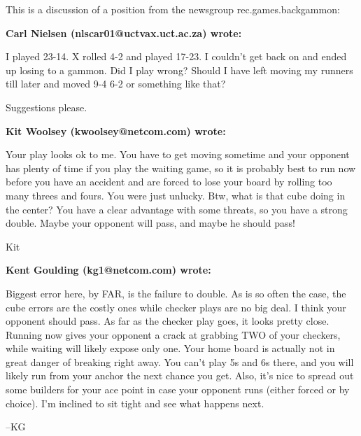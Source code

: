


\setlength{\parindent}{0pt}
\setlength{\parskip}{1em}

This is a discussion of a position from the newsgroup rec.games.backgammon:

\begin{position}
\smallboard
{}

\whiteonmove
\shownumbers
\showcube

\end{position}

{\bf Carl Nielsen (nlscar01@uctvax.uct.ac.za) wrote:}

I played 23-14. X rolled 4-2 and played 17-23. I couldn't get back on and 
ended up losing to a gammon. Did I play wrong? Should I have left moving my 
runners till later and moved 9-4 6-2 or something like that?

Suggestions please.

{\bf Kit Woolsey (kwoolsey@netcom.com) wrote:}

Your play looks ok to me.  You have to get moving sometime and your 
opponent has plenty of time if you play the waiting game, so it is 
probably best to run now before you have an accident and are forced to 
lose your board by rolling too many threes and fours.  You were just 
unlucky.  Btw, what is that cube doing in the center?  You have a clear 
advantage with some threats, so you have a strong double.  Maybe your 
opponent will pass, and maybe he should pass!

Kit

{\bf Kent Goulding (kg1@netcom.com) wrote:}

Biggest error here, by FAR, is the failure to double.  As is so often the 
case, the cube errors are the costly ones while checker plays are no big 
deal.  I think your opponent should pass.  As far as the checker play 
goes, it looks pretty close.  Running now gives your opponent a crack at 
grabbing TWO of your checkers, while waiting will likely expose only 
one.  Your home board is actually not in great danger of breaking right 
away. You can't play 5s and 6s there, and you will likely run from your 
anchor the next chance you get.  Also, it's nice to spread out some 
builders for your ace point in case your opponent runs (either forced or 
by choice).  I'm inclined to sit tight and see what happens next.

--KG


